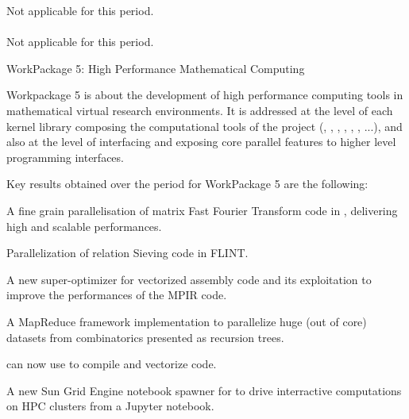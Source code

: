\documentclass{deliverablereport}
\makeatletter
\renewcommand\subsubsection{\@startsection{subsubsection}{2}%
  \z@{.5\linespacing\@plus.7\linespacing}{.1\linespacing}%
  {\normalfont\bfseries}}
\makeatother
\begin{document}
Not applicable for this period.

\paragraph{} %

Not applicable for this period.

\clearpage
  \subsubsection{WorkPackage 5: High Performance Mathematical Computing}
  \label{hpc}

  Workpackage 5 is about the development of high performance computing tools in
  mathematical virtual research environments. It is addressed at the level
  of each kernel library composing the computational tools of the project (\Pari,
  \GAP, \Linbox, \MPIR, \Sage, \Singular, ...), and also at the level of interfacing and exposing
  core parallel features to higher level programming interfaces.

  Key results obtained over the period for WorkPackage 5 are the following:
  \begin{compactitem}
  \item A fine grain parallelisation of matrix Fast Fourier Transform code in
    \FLINT, delivering high and scalable performances.
  \item Parallelization of relation  Sieving code in FLINT.
  \item A new super-optimizer for vectorized assembly code and its
    exploitation to improve the performances of the MPIR code.
  \item A MapReduce framework implementation to parallelize huge (out of core) datasets from
    combinatorics presented as recursion trees.
  \item \Cython can now use \Pythran to compile and vectorize \Numpy code.
  \item A new Sun Grid Engine notebook spawner for \Jupyter to drive
    interractive computations on HPC clusters from a Jupyter notebook.
  \end{compactitem}
\end{document}
